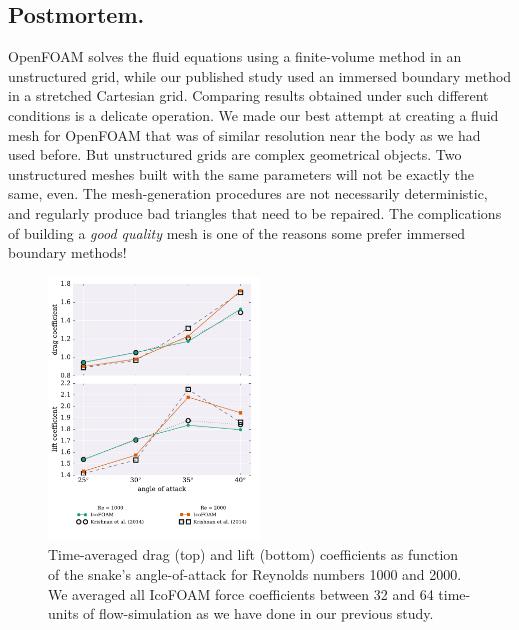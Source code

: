 \documentclass[9pt,twocolumn,twoside]{article}
\begin{document}
\subsection*{Postmortem.} 
OpenFOAM solves the fluid equations using a finite-volume method in an unstructured grid, while our published study used an immersed boundary method in a stretched Cartesian grid. 
Comparing results obtained under such different conditions is a delicate operation. 
We made our best attempt at creating a fluid mesh for OpenFOAM that was of similar resolution near the body as we had used before. 
But unstructured grids are complex geometrical objects. 
Two unstructured meshes built with the same parameters will not be exactly the same, even. 
The mesh-generation procedures are not necessarily deterministic, and regularly produce bad triangles that need to be repaired. 
The complications of building a \textit{good quality} mesh is one of the reasons some prefer immersed boundary methods!



\begin{figure}[t]
\centering
\includegraphics[width=0.5\textwidth]{./figures/openfoam/openfoam_forceCoefficientsVsAoA.pdf}
\caption{
Time-averaged drag (top) and lift (bottom) coefficients as function of the snake's angle-of-attack for Reynolds numbers 1000 and 2000.
We averaged all IcoFOAM force coefficients between 32 and 64 time-units of flow-simulation as we have done in our previous study.
}
\label{figure3}
\end{figure}
\end{document}
